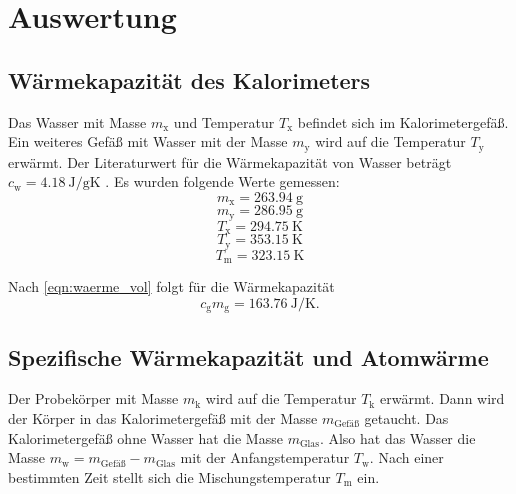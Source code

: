 \section{Auswertung}
\label{sec:Auswertung}
\subsection{Wärmekapazität des Kalorimeters}
Das Wasser mit Masse $m_\text{x}$ und Temperatur $T_\text{x}$ befindet sich im Kalorimetergefäß.
Ein weiteres Gefäß mit Wasser mit der Masse $m_\text{y}$ wird auf die Temperatur $T_\text{y}$ erwärmt.
Der Literaturwert für die Wärmekapazität von Wasser beträgt $c_\text{w} = \SI{4.18}{\joule / \gram\kelvin}$ \cite[159]{anleitung}.
Es wurden folgende Werte gemessen:
\begin{equation*}
    m_\text{x} = \SI{263.94}{\gram}
\end{equation*}
\begin{equation*}
    m_\text{y} = \SI{286.95}{\gram}
\end{equation*}
\begin{equation*}
    T_\text{x} = \SI{294.75}{\kelvin}    
\end{equation*}
\begin{equation*}
    T_\text{y} = \SI{353.15}{\kelvin}
\end{equation*}
\begin{equation*}
    T_\text{m} = \SI{323.15}{\kelvin}
\end{equation*}

Nach \eqref{eqn:waerme_vol} folgt für die Wärmekapazität
\begin{equation}
    c_\text{g}m_\text{g} = \SI{163.76}{\joule/\kelvin} .
\end{equation}

\subsection{Spezifische Wärmekapazität und Atomwärme}
Der Probekörper mit Masse $m_\text{k}$ wird auf die Temperatur $T_\text{k}$ erwärmt.
Dann wird der Körper in das Kalorimetergefäß mit der Masse $m_\text{Gefäß}$ getaucht.
Das Kalorimetergefäß ohne Wasser hat die Masse $m_\text{Glas}$.
Also hat das Wasser die Masse $m_\text{w} = m_\text{Gefäß}-m_\text{Glas}$ mit der Anfangstemperatur $T_\text{w}$.
Nach einer bestimmten Zeit stellt sich die Mischungstemperatur $T_\text{m}$ ein.
